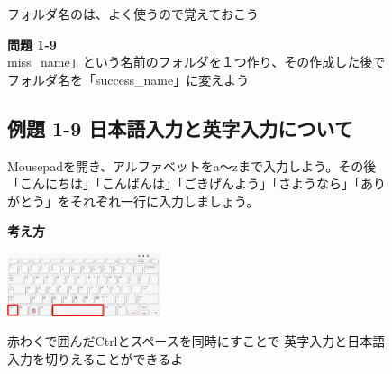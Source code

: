 \begin{figure}[ht]
  \begin{minipage}{5.751cm}
    フォルダ名のは、よく使うので覚えておこう
  \end{minipage}

  \flushleft
  \noindent \textbf{問題 1-9}\\
  miss\_name」という名前のフォルダを１つ作り、その作成した後でフォルダ名を「success\_name」に変えよう

\end{figure}


\clearpage

\begin{figure}[ht]
  \subsection{例題 1-9 日本語入力と英字入力について}
  \flushleft
  Mousepadを開き、アルファベットをa〜zまで入力しよう。その後「こんにちは」「こんばんは」「ごきげんよう」「さようなら」「ありがとう」をそれぞれ一行に入力しましょう。
  
  {\bf\large 考え方}

  \centering
  \begin{minipage}{\textwidth}
    \includegraphics[width=0.4\textwidth]{text01-img/2024_keyboard.jpg}
    \raisebox{10mm}
    {
      \begin{minipage}{0.5\textwidth}
        赤わくで囲んだCtrlとスペースを同時にすことで
        英字入力と日本語入力を切りえることができるよ
      \end{minipage}
    }
  \end{minipage}


\end{figure}
